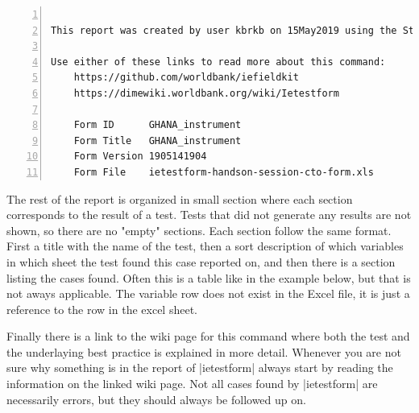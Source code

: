 \documentclass{tufte-handout}
\begin{document}
	\begin{minipage}{1.5\textwidth}
		\vspace{.5cm}
	 	\begin{Verbatim}[frame=lines,
						numbers=left,
						label=ietestform-header,
						samepage=true,
						baselinestretch=0.75]

This report was created by user kbrkb on 15May2019 using the Stata command ietestform

Use either of these links to read more about this command:
	https://github.com/worldbank/iefieldkit
	https://dimewiki.worldbank.org/wiki/Ietestform

	Form ID      GHANA_instrument
	Form Title   GHANA_instrument
	Form Version 1905141904
	Form File    ietestform-handson-session-cto-form.xls
		\end{Verbatim}
		\vspace{.5cm}
 	\end{minipage}
 
	\noindent The rest of the report is organized in small section where each section corresponds to the result of a test. Tests that did not generate any results are not shown, so there are no "empty" sections. Each section follow the same format. First a title with the name of the test, then a sort description of which variables in which sheet the test found this case reported on, and then there is a section listing the cases found. Often this is a table like in the example below, but that is not aways applicable. The variable row does not exist in the Excel file, it is just a reference to the row in the excel sheet.
	
	Finally there is a link to the wiki page for this command where both the test and the underlaying best practice is explained in more detail. Whenever you are not sure why something is in the report of |ietestform| always start by reading the information on the linked wiki page. Not all cases found by |ietestform| are necessarily errors, but they should always be followed up on.
 	
\end{document}
